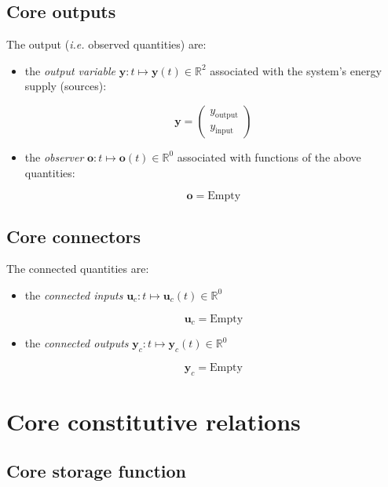 \documentclass[11pt, oneside]{article}      %
\begin{document}
\subsection{Core outputs}

The output (\textit{i.e.} observed quantities) are:


\begin{itemize}


\item the \emph{output variable} ${\mathbf y: t\mapsto \mathbf y(t)\in \mathbb R^{2}}$ associated with the system's energy supply (sources):


$$ \mathbf y = \left(\begin{array}{c}y_{\mathrm{output}}\\y_{\mathrm{input}}\end{array}\right)$$


\item the \emph{observer} ${\mathbf o: t\mapsto \mathbf o(t)\in \mathbb R^{0}}$ associated with functions of the above quantities:


$$ \mathbf o = \mathrm{Empty}$$

\end{itemize}


\subsection{Core connectors}

The connected quantities are:


\begin{itemize}


\item the \emph{connected inputs} ${\mathbf u_c: t\mapsto \mathbf u_c(t)\in \mathbb R^{0}}$


$$ \mathbf u_c = \mathrm{Empty}$$


\item the \emph{connected outputs} ${\mathbf y_c: t\mapsto \mathbf y_c(t)\in \mathbb R^{0}}$


$$ \mathbf y_c = \mathrm{Empty}$$

\end{itemize}

%

%
%
\section{Core constitutive relations}

\subsection{Core storage function}
\end{document}
